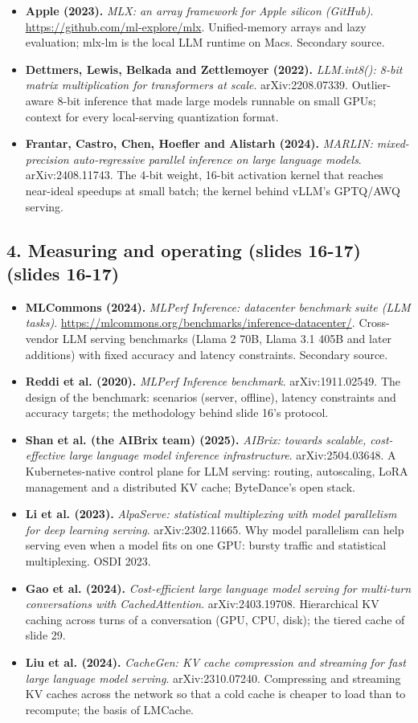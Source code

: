\documentclass[11pt,letterpaper]{article}
\begin{document}
\begin{itemize}[leftmargin=1.2em,itemsep=3pt]
\item \textbf{Apple (2023).} \textit{MLX: an array framework for Apple silicon (GitHub)}. \url{https://github.com/ml-explore/mlx}. Unified-memory arrays and lazy evaluation; mlx-lm is the local LLM runtime on Macs. Secondary source.
\item \textbf{Dettmers, Lewis, Belkada and Zettlemoyer (2022).} \textit{LLM.int8(): 8-bit matrix multiplication for transformers at scale}. arXiv:2208.07339. Outlier-aware 8-bit inference that made large models runnable on small GPUs; context for every local-serving quantization format.
\item \textbf{Frantar, Castro, Chen, Hoefler and Alistarh (2024).} \textit{MARLIN: mixed-precision auto-regressive parallel inference on large language models}. arXiv:2408.11743. The 4-bit weight, 16-bit activation kernel that reaches near-ideal speedups at small batch; the kernel behind vLLM's GPTQ/AWQ serving.
\end{itemize}
\subsection*{4. Measuring and operating (slides 16-17) (slides 16-17)}
\begin{itemize}[leftmargin=1.2em,itemsep=3pt]\sloppy
\item \textbf{MLCommons (2024).} \textit{MLPerf Inference: datacenter benchmark suite (LLM tasks)}. \url{https://mlcommons.org/benchmarks/inference-datacenter/}. Cross-vendor LLM serving benchmarks (Llama 2 70B, Llama 3.1 405B and later additions) with fixed accuracy and latency constraints. Secondary source.
\item \textbf{Reddi et al. (2020).} \textit{MLPerf Inference benchmark}. arXiv:1911.02549. The design of the benchmark: scenarios (server, offline), latency constraints and accuracy targets; the methodology behind slide 16's protocol.
\item \textbf{Shan et al. (the AIBrix team) (2025).} \textit{AIBrix: towards scalable, cost-effective large language model inference infrastructure}. arXiv:2504.03648. A Kubernetes-native control plane for LLM serving: routing, autoscaling, LoRA management and a distributed KV cache; ByteDance's open stack.
\item \textbf{Li et al. (2023).} \textit{AlpaServe: statistical multiplexing with model parallelism for deep learning serving}. arXiv:2302.11665. Why model parallelism can help serving even when a model fits on one GPU: bursty traffic and statistical multiplexing. OSDI 2023.
\item \textbf{Gao et al. (2024).} \textit{Cost-efficient large language model serving for multi-turn conversations with CachedAttention}. arXiv:2403.19708. Hierarchical KV caching across turns of a conversation (GPU, CPU, disk); the tiered cache of slide 29.
\item \textbf{Liu et al. (2024).} \textit{CacheGen: KV cache compression and streaming for fast large language model serving}. arXiv:2310.07240. Compressing and streaming KV caches across the network so that a cold cache is cheaper to load than to recompute; the basis of LMCache.
\end{itemize}
\end{document}
